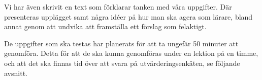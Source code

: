     \textcolor{lila}{Vi har även skrivit en text som förklarar tanken med våra uppgifter. Där presenteras upplägget samt några idéer på hur man ska agera som lärare, bland annat genom att undvika att framställa ett förslag som felaktigt.}
    
    \textcolor{lila}{De uppgifter som ska testas har planerats för att ta ungefär 50 minuter att genomföra. Detta för att de ska kunna genomföras under en lektion på en timme, och att det ska finnas tid över att svara på utvärderingsenkäten, se följande avsnitt.}
            
            
